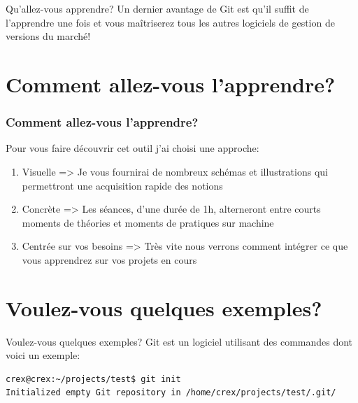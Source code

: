 \documentclass{beamer}
\begin{document}
\begin{frame}[fragile]{Qu'allez-vous apprendre?}
Un dernier avantage de Git est qu'il suffit de l'apprendre une fois et vous maîtriserez tous les autres logiciels de gestion de versions du marché!
\end{frame}


\section{Comment allez-vous l'apprendre?}
\begin{frame}
\frametitle{Comment allez-vous l'apprendre?}
Pour vous faire découvrir cet outil j'ai choisi une approche:\\
\medskip

\begin{enumerate}
    \item Visuelle => Je vous fournirai de nombreux schémas et illustrations qui permettront une acquisition rapide des notions
    \item Concrète => Les séances, d'une durée de 1h, alterneront entre courts moments de théories et moments de pratiques sur machine
    \item Centrée sur vos besoins => Très vite nous verrons comment intégrer ce que vous apprendrez sur vos projets en cours
\end{enumerate}
\end{frame}


\section{Voulez-vous quelques exemples?}
\begin{frame}[fragile]{Voulez-vous quelques exemples?}
Git est un logiciel utilisant des commandes dont voici un exemple:
\begin{mdframed}[style=Bash]
    \begin{lstlisting}[style=Bash, caption={Contenu du dossier .git/}]
crex@crex:~/projects/test$ git init
Initialized empty Git repository in /home/crex/projects/test/.git/
    \end{lstlisting}
\end{mdframed}
\end{frame}
\end{document}
